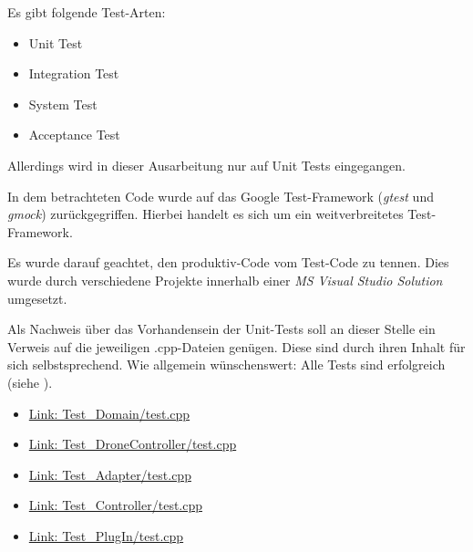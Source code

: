 Es gibt folgende Test-Arten:
\begin{itemize}
\item Unit Test
\item Integration Test
\item System Test
\item Acceptance Test
\end{itemize}

Allerdings wird in dieser Ausarbeitung nur auf Unit Tests eingegangen.


In dem betrachteten Code wurde auf das Google Test-Framework (\textit{gtest} und \textit{gmock}) zurückgegriffen. Hierbei handelt es sich um ein weitverbreitetes Test-Framework. 

Es wurde darauf geachtet, den produktiv-Code vom Test-Code zu tennen. Dies wurde durch verschiedene Projekte innerhalb einer \textit{MS Visual Studio Solution} umgesetzt.


Als Nachweis über das Vorhandensein der Unit-Tests soll an dieser Stelle ein Verweis auf die jeweiligen .cpp-Dateien genügen. Diese sind durch ihren Inhalt für sich selbstsprechend. Wie allgemein wünschenswert: Alle Tests sind erfolgreich (siehe ).

\begin{itemize}
\item \href{https://github.com/MobMonRob/ROSLabDrohne/blob/9edc7b5814c1bb731abf0f7af4352289e57b681f/Code/Test\_Domain/test.cpp}{Link: Test\_Domain/test.cpp}
\item \href{https://github.com/MobMonRob/ROSLabDrohne/blob/9edc7b5814c1bb731abf0f7af4352289e57b681f/Code/Test\_DroneController/test.cpp}{Link: Test\_DroneController/test.cpp}
\item \href{https://github.com/MobMonRob/ROSLabDrohne/blob/9edc7b5814c1bb731abf0f7af4352289e57b681f/Code/Test\_Adapter/test.cpp}{Link: Test\_Adapter/test.cpp}
\item \href{https://github.com/MobMonRob/ROSLabDrohne/blob/9edc7b5814c1bb731abf0f7af4352289e57b681f/Code/Test\_Controller/test.cpp}{Link: Test\_Controller/test.cpp}
\item \href{https://github.com/MobMonRob/ROSLabDrohne/blob/9edc7b5814c1bb731abf0f7af4352289e57b681f/Code/Test\_PlugIn/test.cpp}{Link: Test\_PlugIn/test.cpp}
\end{itemize}

